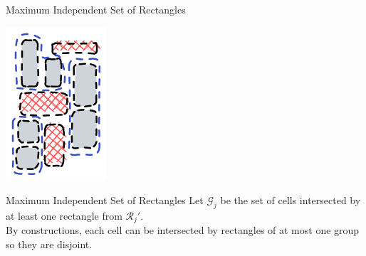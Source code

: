\documentclass[handout,usenames,dvipsnames]{beamer}
\begin{document}
\begin{frame}{Maximum Independent Set of Rectangles}
{\begin{minipage}{0.35\textwidth}
        \includegraphics[width=\textwidth]{l8.png}
    \end{minipage}
    }
    
\end{frame}

\begin{frame}{Maximum Independent Set of Rectangles}
    Let $\mathcal G_j$ be the set of cells intersected by at least one rectangle from $\mathcal R_j'.$ \\
    \pause
    By constructions, each cell can be intersected by rectangles of at most one group so they are disjoint. \\
\end{frame}
\end{document}
